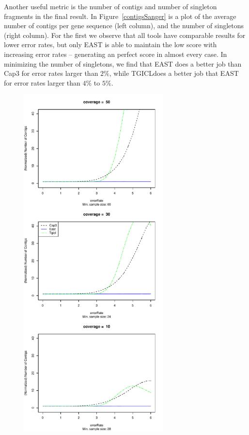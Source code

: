 \documentclass[10pt]{bmc_article}
\newcommand{\capthree} {{\small Cap3}}
\newcommand{\tgicl} {{\small TGICL}}
\newcommand{\east} {{\small EAST}}
\newenvironment{bmcformat}{\begin{raggedright}\baselineskip20pt\sloppy\setboolean{publ}{false}}{\end{raggedright}\baselineskip20pt\sloppy}
\begin{document}
\begin{bmcformat}
Another useful metric is the number of contigs and number of singleton
fragments in the final result.  In Figure~\ref{contigsSanger} is a
plot of the average number of contigs per gene sequence (left column), and
the number of singletons (right column).  For the first we observe that all tools have
comparable results for lower error rates, but only \east\/ is able to
maintain the low score with increasing error rates -- generating an
perfect score in almost every case.  In minimizing the
number of singletons, we find that \east\/ does a better job than
\capthree\/ for error rates larger than $2\%$, while \tgicl does a
better job that \east\/ for error rates larger than $4\%$ to $5\%$.

\begin{figure}[htb]
\begin{minipage}{3in}
\includegraphics[width=3in]{pics.d/numContigs_sanger.pdf}
\end{minipage}

\end{figure}
\end{bmcformat}
\end{document}
